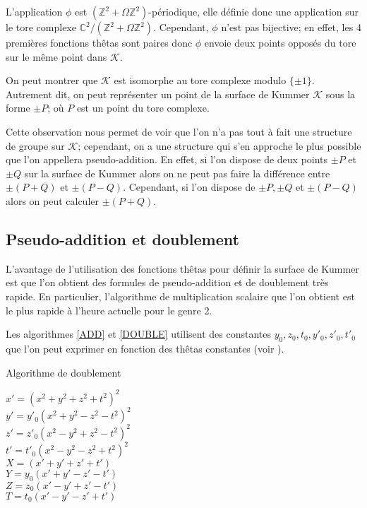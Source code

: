 \documentclass[a4paper]{article}
\theoremstyle{definition}
\theoremstyle{remark}
\numberwithin{equation}{section}
\begin{document}
L'application $\phi$ est $(\mathbb{Z}^2 + \Omega\mathbb{Z}^2)$-périodique, elle définie donc une application sur le tore complexe $\mathbb{C}^2/(\mathbb{Z}^2+\Omega\mathbb{Z}^2)$. Cependant, $\phi$ n'est pas bijective; en effet, les 4 premières fonctions thêtas sont paires donc $\phi$ envoie deux points opposés du tore sur le même point dans $\mathcal{K}$.

On peut montrer que $\mathcal{K}$ est isomorphe au tore complexe modulo $\{\pm 1\}$. Autrement dit, on peut représenter un point de la surface de Kummer $\mathcal{K}$ sous la forme $\pm P$; où $P$ est un point du tore complexe.

Cette observation nous permet de voir que l'on n'a pas tout à fait une structure de groupe sur $\mathcal{K}$; cependant, on a une structure qui s'en approche le plus possible que l'on appellera pseudo-addition. En effet, si l'on dispose de deux points $\pm P$ et $\pm Q$ sur la surface de Kummer alors on ne peut pas faire la différence entre $\pm(P+Q)$ et $\pm(P-Q)$. Cependant, si l'on dispose de $\pm P,\pm Q$ et $\pm(P-Q)$ alors on peut calculer $\pm(P+Q)$.

\subsection{Pseudo-addition et doublement}

L'avantage de l'utilisation des fonctions thêtas pour définir la surface de Kummer est que l'on obtient des formules de pseudo-addition et de doublement très rapide. En particulier, l'algorithme de multiplication scalaire que l'on obtient est le plus rapide à l'heure actuelle pour le genre 2.

Les algorithmes \ref{ADD} et \ref{DOUBLE} utilisent des constantes $y_0,z_0,t_0,y'_0,z'_0,t'_0$ que l'on peut exprimer en fonction des thêtas constantes (voir \citet{gaudry}).

\begin{algorithm}
\label{DOUBLE}
\caption{Algorithme de doublement}
$x' = (x^2 + y^2 + z^2 + t^2)^2$ \\
$y' = y'_0(x^2 + y^2 - z^2 - t^2)^2$ \\
$z' = z'_0(x^2 - y^2 + z^2 - t^2)^2$ \\
$t' = t'_0(x^2 - y^2 - z^2 + t^2)^2$ \\
$X = (x' + y' + z' + t')$ \\
$Y = y_0(x' + y' - z' - t')$ \\
$Z = z_0(x' - y' + z' - t')$ \\
$T = t_0(x' - y' - z' + t')$ \\
\end{algorithm}
\end{document}

